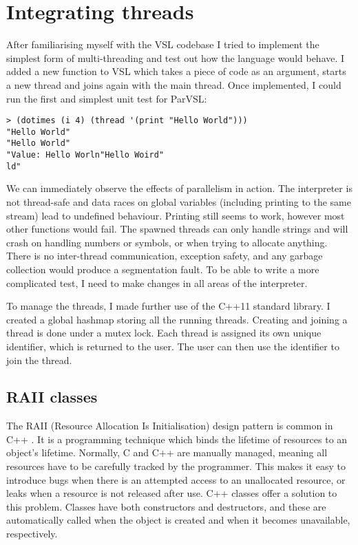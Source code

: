 \section{Integrating threads}
\label{sec:babythreads}
After familiarising myself with the VSL codebase I tried to implement the simplest form of
multi-threading and test out how the language would behave. I added a new function to VSL
which takes a piece of code as an argument, starts a new thread and joins again with
the main thread. Once implemented, I could run the first and simplest unit test for ParVSL:

\begin{verbatim}
> (dotimes (i 4) (thread '(print "Hello World")))
"Hello World"
"Hello World"
"Value: Hello Worln"Hello Woird"
ld"
\end{verbatim}

We can immediately observe the effects of parallelism in action. The interpreter is not thread-safe and data races
on global variables (including printing to the same stream) lead to undefined behaviour. Printing
still seems to work, however most other functions would fail. The spawned threads can only handle strings
and will crash on handling numbers or symbols, or when trying to allocate anything.
There is no inter-thread communication, exception safety, and any garbage collection would produce a segmentation
fault. To be able to write a more complicated test, I need to make changes in all areas of the interpreter.

To manage the threads, I made further use of the C++11 standard library. I created a global hashmap storing
all the running threads. Creating and joining a thread is done under a mutex lock. Each thread is assigned its own unique
identifier, which is returned to the user. The user can then use the identifier to join the thread.

\subsection{RAII classes}
\label{sec:raii}
The RAII (Resource Allocation Is Initialisation) design pattern is common in C++ \cite{effective-cpp}.
It is a programming technique which binds the lifetime of resources to an object's lifetime. Normally,
C and C++ are manually managed, meaning all resources have to be carefully tracked by the programmer.
This makes it easy to introduce bugs when there is an attempted access to an unallocated resource,
or leaks when a resource is not released after use. C++ classes offer a solution to this problem.
Classes have both constructors and destructors, and these are automatically called when the object
is created and when it becomes unavailable, respectively.

